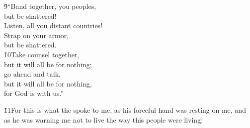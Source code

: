 \begin{poetry}
\poeml \v{9}``Band together, you peoples, \\
\poemll    but be shattered! \\
\poemlll       Listen, all you distant countries! \\
\poeml Strap on your armor, \\
\poemlll       but be shattered. \\
\poeml \v{10}Take counsel together, \\
\poemll    but it will all be for nothing; \\
\poeml go ahead and talk, \\
\poemll    but it will all be for nothing, \\
\poemlll       for God is with us.''
\end{poetry}

\v{11}For this is what the  spoke to me, as his forceful hand was resting on me, and as he was warning me not to live the way this people were living:

